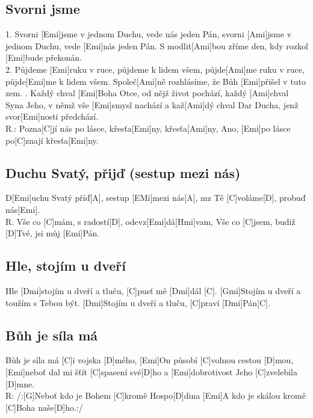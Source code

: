 \documentclass[10pt]{article}
\begin{document}
\begin{Large}
\begin{minipage}{\textwidth}
\subsection{Svorni jsme}
\begin{multicols}{2}
\begin{guitar}
	1. Svorni [Emi]jsme v jednom Duchu, 
	vede nás jeden Pán,
	svorni [Ami]jsme v jednom Duchu, 
	vede [Emi]nás jeden Pán.
	S modlit[Ami]bou zříme den, 
	kdy rozkol [Emi]bude překonán.
	\\
	2. Půjdeme [Emi]ruku v ruce, 
	půjdeme k lidem všem,
	půjde[Ami]me ruku v ruce, 
	půjde[Emi]me k lidem všem.
	Společ[Ami]ně rozhlásíme, 
	že Bůh [Emi]přišel v tuto zem.
	. Každý chval [Emi]Boha Otce, 
	od nějž život pochází,
	každý [Ami]chval Syna Jeho, 
	v němž vše [Emi]smysl nachází
	a kaž[Ami]dý chval Dar Ducha, 
	jenž svor[Emi]nosti předchází.
	\\
	R.: Pozna[C]jí nás po lásce, 
	křesťa[Emi]ny, křesťa[Ami]ny,
	Ano, [Emi]po lásce po[C]znají křesťa[Emi]ny.
\end{guitar}
\end{multicols}
\end{minipage}

\begin{minipage}{\textwidth}
\begin{multicols}{2}
\subsection{Duchu Svatý, přijď (sestup mezi nás)}
\begin{guitar}	
	D[Emi]uchu Svatý příď[A], sestup [EMi]mezi nás[A],
	mz Tě [C]voláme[D], probuď nás[Emi].
	\\
	R. Vše co [C]mám, s radostí[D], odevz[Emi]dá[Hmi]vam,
	Vše co [C]jsem, budiž [D]Tvé, jsi můj [Emi]Pán.
\end{guitar}

\subsection{Hle, stojím u dveří}
\begin{guitar}	
	Hle [Dmi]stojím u dveří a tluču, [C]pusť mě [Dmi]dál [C].
	[Gmi]Stojím u dveří a toužím s Tebou být.
	[Dmi]Stojím u dveří a tluču, [C]praví [Dmi]Pán[C].
\end{guitar}

\columnbreak

\subsection{Bůh je síla má}
\begin{guitar}
	[Emi]Bůh je síla má [C]i vojska [D]mého,
	[Emi]On působí [C]volnou cestou [D]mou,
	[Emi]neboť dal mi šťít [C]spasení své[D]ho
	a [Emi]dobrotivost Jeho [C]zvelebila [D]mne.
	\\
	R: /:[G]Neboť kdo je Bohem [C]kromě Hospo[D]dina
	[Emi]A kdo je skálou kromě [C]Boha naše[D]ho.:/
\end{guitar}
\end{multicols}
\end{minipage}


\end{Large}
\end{document}
